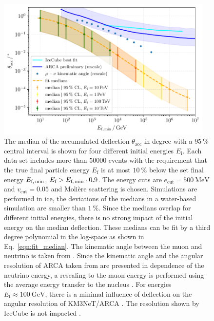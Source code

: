 \documentclass[pdflatex, sn-mathphys]{sn-jnl}%
\theoremstyle{thmstyleone}%
\theoremstyle{thmstyletwo}%
\theoremstyle{thmstylethree}%
\begin{document}
\begin{figure}
    \centering 
    \includegraphics[width=0.96\textwidth]{../../deflection/plots/FINAL/fit_median_defl_cut_10percent_only_poly_new_resolution_rescale_no_icecube_paper_final.pdf}
    \caption{The median of the accumulated deflection $\theta_{\text{acc}}$ in degree 
    with a $\SI{95}{\percent}$ 
    central interval is shown for four different initial energies $E_{\text{i}}$. 
    Each data set includes more than $\num{50000}$ events with the requirement 
    that the true final particle energy $E_{\text{f}}$ is at most 
    $\SI{10}{\percent}$ below the set final energy $E_{\text{f,\,min}}$,   
    $E_{\text{f}} > E_{\text{f,\,min}} \cdot 0.9$. The energy cuts are $e_{\mathrm{cut}} = \SI{500}{\mega\electronvolt}$ and $v_{\mathrm{cut}} = 0.05$ and 
    Molière scattering is chosen. Simulations are performed in ice, the deviations 
    of the medians in a water-based simulation are smaller than $\SI{1}{\percent}$.
    Since the medians overlap for different initial energies, there is no 
    strong impact of the initial energy on the median deflection. These 
    medians can be fit by a third degree polynomial in the log-space as 
    shown in Eq.~\eqref{eqn:fit_median}. The kinematic angle between the muon and 
    neutrino is taken from \cite{KM3NeT_Resolution2016}. Since the kinematic angle and 
    the angular resolution of ARCA taken from \cite{KM3NeT_Resolution2016, KM3NeT_Resolution2021} are 
    presented in dependence of the neutrino energy, a rescaling to the muon energy is performed 
    using the average energy transfer to the nucleus \cite{GANDHI199681}. 
    For energies 
    $E_{\text{f}} \approx \SI{100}{\giga\electronvolt}$, there is a minimal influence of deflection on the angular resolution of 
    KM3NeT/ARCA \cite{KM3NeT_Resolution2021}. The resolution shown by IceCube is not 
    impacted \cite{IceCube_Resolution2021}.}
    \label{fig:fit_median}
\end{figure}
\end{document}
